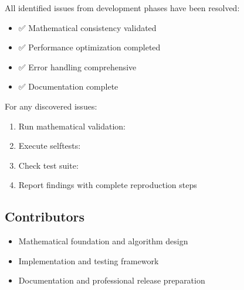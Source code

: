 \documentclass[letterpaper,10pt,english]{sphinxmanual}
\begin{document}
\sphinxAtStartPar
All identified issues from development phases have been resolved:
\begin{itemize}
\item {} 
\sphinxAtStartPar
✅ Mathematical consistency validated

\item {} 
\sphinxAtStartPar
✅ Performance optimization completed

\item {} 
\sphinxAtStartPar
✅ Error handling comprehensive

\item {} 
\sphinxAtStartPar
✅ Documentation complete

\end{itemize}

\sphinxAtStartPar
{}

\sphinxAtStartPar
For any discovered issues:
\begin{enumerate}
%
\item {} 
\sphinxAtStartPar
Run mathematical validation: 

\item {} 
\sphinxAtStartPar
Execute self\sphinxhyphen{}tests: 

\item {} 
\sphinxAtStartPar
Check test suite: 

\item {} 
\sphinxAtStartPar
Report findings with complete reproduction steps

\end{enumerate}


\subsection{Contributors}
\label{\detokenize{changelog:contributors}}
\sphinxAtStartPar
{}
\begin{itemize}
\item {} 
\sphinxAtStartPar
Mathematical foundation and algorithm design

\item {} 
\sphinxAtStartPar
Implementation and testing framework

\item {} 
\sphinxAtStartPar
Documentation and professional release preparation

\end{itemize}
\end{document}
